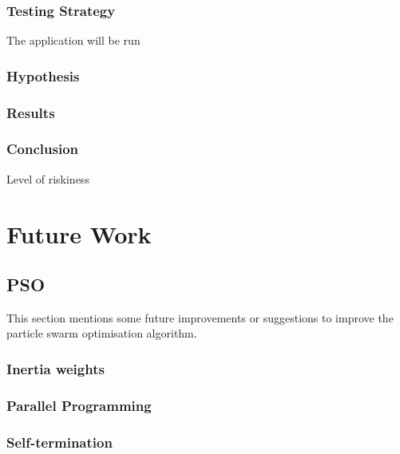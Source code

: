 \documentclass{pdfmx4020}
\begin{document}
    \subsection{Testing Strategy}
      The application will be run

    \subsection{Hypothesis}

    \subsection{Results}

    \subsection{Conclusion}

    Level of riskiness



\chapter{Future Work}

  \section{PSO} %
  \label{sec:pso}
  This section mentions some future improvements or suggestions to improve the particle swarm optimisation algorithm.
    \subsection{Inertia weights} %
    \label{sub:inertia_weights2}
    
    \subsection{Parallel Programming} %
    \label{sub:parallel_programming}
    
    \subsection{Self-termination} %
    \label{sub:self_termination}
    
\end{document}
